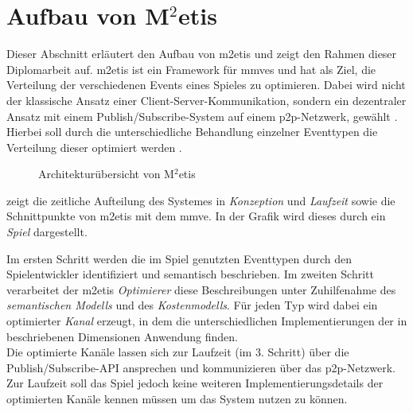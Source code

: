 \section{Aufbau von M$^2$etis}
\label{chap:grundlagen:aufbau_metis}

Dieser Abschnitt erläutert den Aufbau von \ac{m2etis}  und zeigt den Rahmen dieser Diplomarbeit auf. \ac{m2etis} ist ein Framework für \acp{mmve} und hat als Ziel, die Verteilung der verschiedenen Events eines Spieles zu optimieren. Dabei wird nicht der klassische Ansatz einer Client-Server-Kommunikation, sondern ein dezentraler Ansatz mit einem Publish/Subscribe-System auf einem \ac{p2p}-Netzwerk, gewählt \cite{Fischer2010a}. Hierbei soll durch die unterschiedliche Behandlung einzelner Eventtypen die Verteilung dieser optimiert werden \cite{Fischer2010Event}.

\begin{figure}[htbp]
\centering
{}
\caption{Architekturübersicht von M$^2$etis}
\label{fig:metis_aufbau}
\end{figure}

 zeigt die zeitliche Aufteilung des Systemes in \emph{Konzeption} und \emph{Laufzeit} sowie die Schnittpunkte von \ac{m2etis} mit dem \ac{mmve}. In der Grafik wird dieses durch ein \emph{Spiel} dargestellt.

Im ersten Schritt werden die im Spiel genutzten Eventtypen durch den Spielentwickler identifiziert und semantisch beschrieben. Im zweiten Schritt verarbeitet der \ac{m2etis} \emph{Optimierer} diese Beschreibungen unter Zuhilfenahme des \emph{semantischen Modells} und des \emph{Kostenmodells}. Für jeden Typ wird dabei ein optimierter \emph{Kanal} erzeugt, in dem die unterschiedlichen Implementierungen der in \cite{Fischer2010a} beschriebenen Dimensionen Anwendung finden.\\
Die optimierte Kanäle lassen sich zur Laufzeit (im 3. Schritt) über die Publish/Subscribe-API ansprechen und kommunizieren über das \ac{p2p}-Netzwerk. Zur Laufzeit soll das Spiel jedoch keine weiteren Implementierungsdetails der optimierten Kanäle kennen müssen um das System nutzen zu können.

